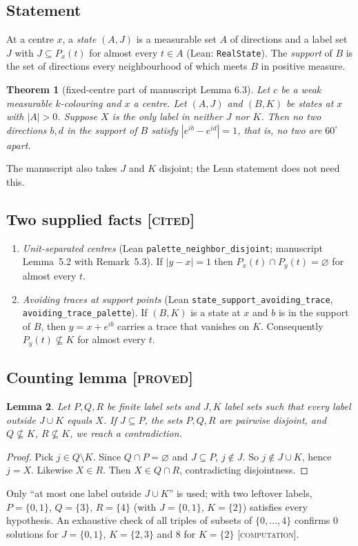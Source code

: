 \documentclass[11pt]{article}
\newtheorem{theorem}{Theorem}[section]
\newtheorem{lemma}[theorem]{Lemma}
\theoremstyle{definition}
\theoremstyle{remark}
\newcommand{\st}[1]{\textsc{[#1]}}
\begin{document}
\subsection{Statement}
At a centre $x$, a \emph{state} $(A,J)$ is a measurable set $A$ of directions and a label set $J$ with $J\subseteq P_x(t)$ for almost every $t\in A$ (Lean: \texttt{RealState}). The \emph{support} of $B$ is the set of directions every neighbourhood of which meets $B$ in positive measure.

\begin{theorem}[fixed-centre part of manuscript Lemma 6.3]\label{thm:three}
Let $c$ be a weak measurable $k$-colouring and $x$ a centre. Let $(A,J)$ and $(B,K)$ be states at $x$ with $|A|>0$. Suppose $X$ is the only label in neither $J$ nor $K$. Then no two directions $b,d$ in the support of $B$ satisfy $|e^{ib}-e^{id}|=1$, that is, no two are $60^\circ$ apart.
\end{theorem}
The manuscript also takes $J$ and $K$ disjoint; the Lean statement does not need this.

\subsection{Two supplied facts \st{cited}}
\begin{enumerate}
\item[(F1)] \emph{Unit-separated centres} (Lean \texttt{palette\_\allowbreak{}neighbor\_\allowbreak{}disjoint}; manuscript Lemma~5.2 with Remark~5.3). If $|y-x|=1$ then $P_x(t)\cap P_y(t)=\varnothing$ for almost every $t$.
\item[(F2)] \emph{Avoiding traces at support points} (Lean \texttt{state\_\allowbreak{}support\_\allowbreak{}avoiding\_\allowbreak{}trace}, \texttt{avoiding\_\allowbreak{}trace\_\allowbreak{}palette}). If $(B,K)$ is a state at $x$ and $b$ is in the support of $B$, then $y=x+e^{ib}$ carries a trace that vanishes on $K$. Consequently $P_y(t)\not\subseteq K$ for almost every $t$.
\end{enumerate}

\subsection{Counting lemma \st{proved}}
\begin{lemma}\label{lem:count}
Let $P,Q,R$ be finite label sets and $J,K$ label sets such that every label outside $J\cup K$ equals $X$. If $J\subseteq P$, the sets $P,Q,R$ are pairwise disjoint, and $Q\not\subseteq K$, $R\not\subseteq K$, we reach a contradiction.
\end{lemma}
\begin{proof}
Pick $j\in Q\setminus K$. Since $Q\cap P=\varnothing$ and $J\subseteq P$, $j\notin J$. So $j\notin J\cup K$, hence $j=X$. Likewise $X\in R$. Then $X\in Q\cap R$, contradicting disjointness.
\end{proof}
Only ``at most one label outside $J\cup K$'' is used; with two leftover labels, $P=\{0,1\}$, $Q=\{3\}$, $R=\{4\}$ (with $J=\{0,1\}$, $K=\{2\}$) satisfies every hypothesis. An exhaustive check of all triples of subsets of $\{0,\dots,4\}$ confirms 0 solutions for $J=\{0,1\}$, $K=\{2,3\}$ and 8 for $K=\{2\}$ \st{computation}.
\end{document}
